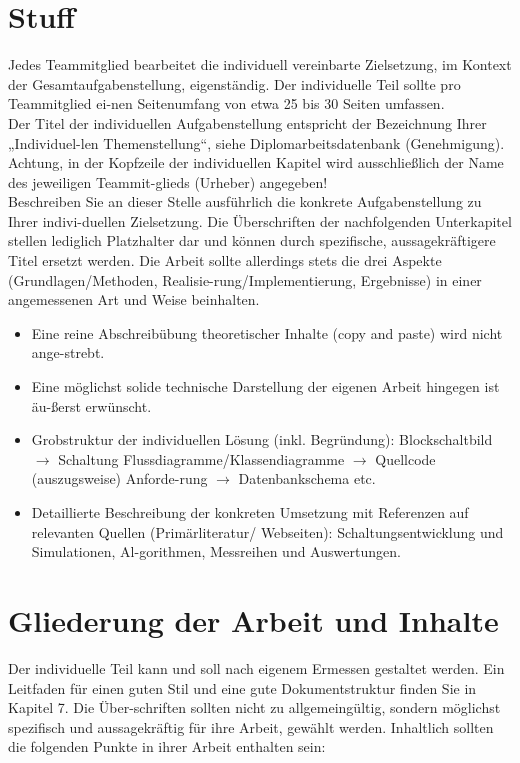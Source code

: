 \documentclass{article}
\begin{document}
\color{black}
\newpage
\section{Stuff}

\color{blue}
Jedes Teammitglied bearbeitet die individuell vereinbarte Zielsetzung, im Kontext der Gesamtaufgabenstellung, eigenständig. Der individuelle Teil sollte pro Teammitglied ei-nen Seitenumfang von etwa 25 bis 30 Seiten umfassen.\\
Der Titel der individuellen Aufgabenstellung entspricht der Bezeichnung Ihrer „Individuel-len Themenstellung“, siehe Diplomarbeitsdatenbank (Genehmigung). Achtung, in der Kopfzeile der individuellen Kapitel wird ausschließlich der Name des jeweiligen Teammit-glieds (Urheber) angegeben!\\
Beschreiben Sie an dieser Stelle ausführlich die konkrete Aufgabenstellung zu Ihrer indivi-duellen Zielsetzung. Die Überschriften der nachfolgenden Unterkapitel stellen lediglich Platzhalter dar und können durch spezifische, aussagekräftigere Titel ersetzt werden. Die Arbeit sollte allerdings stets die drei Aspekte (Grundlagen/Methoden, Realisie-rung/Implementierung, Ergebnisse) in einer angemessenen Art und Weise beinhalten.\\

\begin{itemize}
    \item Eine reine Abschreibübung theoretischer Inhalte (copy and paste) wird nicht ange-strebt.
    \item Eine möglichst solide technische Darstellung der eigenen Arbeit hingegen ist äu-ßerst erwünscht.
    \item Grobstruktur der individuellen Lösung (inkl. Begründung): Blockschaltbild \(\rightarrow\) Schaltung  Flussdiagramme/Klassendiagramme \(\rightarrow\) Quellcode (auszugsweise) \textbar Anforde-rung \(\rightarrow\) Datenbankschema \textbar etc.
    \item Detaillierte Beschreibung der konkreten Umsetzung mit Referenzen auf relevanten Quellen (Primärliteratur/ Webseiten): Schaltungsentwicklung und Simulationen, Al-gorithmen, Messreihen und Auswertungen.
\end{itemize}

\section*{Gliederung der Arbeit und Inhalte}
Der individuelle Teil kann und soll nach eigenem Ermessen gestaltet werden. Ein Leitfaden für einen guten Stil und eine gute Dokumentstruktur finden Sie in Kapitel 7. Die Über-schriften sollten nicht zu allgemeingültig, sondern möglichst spezifisch und aussagekräftig für ihre Arbeit, gewählt werden. Inhaltlich sollten die folgenden Punkte in ihrer Arbeit enthalten sein:
\end{document}
